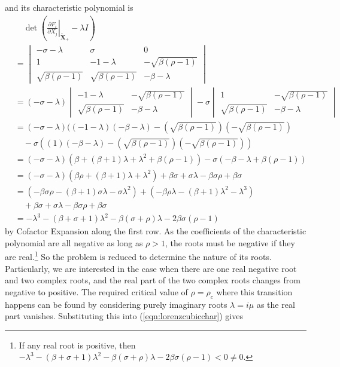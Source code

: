 and its characteristic polynomial is
\begin{align}
&\quad \det(\left.\frac{\partial F_i}{\partial X_j}\right|_{\tilde{\textbf{X}}_{+}} - \lambda I) \nonumber \\
&= 
\begin{vmatrix}
-\sigma-\lambda & \sigma & 0 \\
1 & -1-\lambda & -\sqrt{\beta (\rho - 1)} \\
\sqrt{\beta (\rho - 1)} & \sqrt{\beta (\rho - 1)} & -\beta-\lambda
\end{vmatrix} \nonumber \\ 
&= (-\sigma-\lambda)
\begin{vmatrix}
-1-\lambda & -\sqrt{\beta (\rho - 1)} \\  
\sqrt{\beta (\rho - 1)} & -\beta-\lambda 
\end{vmatrix} - \sigma
\begin{vmatrix}
1 & -\sqrt{\beta (\rho - 1)} \\
\sqrt{\beta (\rho - 1)} & -\beta-\lambda    
\end{vmatrix} \nonumber \\
&= (-\sigma - \lambda)((-1-\lambda)( -\beta-\lambda) - (\sqrt{\beta (\rho - 1)})(-\sqrt{\beta (\rho - 1)}) \nonumber \\
&\quad -\sigma((1)(-\beta-\lambda) - (\sqrt{\beta (\rho - 1)})(-\sqrt{\beta (\rho - 1)})) \nonumber \\
&= (-\sigma - \lambda)(\beta + (\beta+1)\lambda + \lambda^2 + \beta(\rho-1)) -\sigma(-\beta-\lambda + \beta (\rho - 1)) \nonumber\\
&= (-\sigma - \lambda)(\beta\rho + (\beta+1)\lambda + \lambda^2) + \beta\sigma + \sigma\lambda - \beta\sigma\rho + \beta\sigma \nonumber \\
&= (-\beta\sigma\rho -(\beta+1)\sigma\lambda - \sigma \lambda^2) + (-\beta\rho\lambda - (\beta+1)\lambda^2 - \lambda^3) \nonumber\\
&\quad + \beta\sigma + \sigma\lambda - \beta\sigma\rho + \beta\sigma \nonumber \\
&= -\lambda^3 - (\beta + \sigma + 1)\lambda^2 -\beta(\sigma + \rho)\lambda -2 \beta\sigma(\rho - 1) \label{eqn:lorenzcubicchar}
\end{align}
by Cofactor Expansion along the first row. As the coefficients of the characteristic polynomial are all negative as long as $\rho > 1$, the roots must be negative if they are real.\footnote{If any real root is positive, then $-\lambda^3 - (\beta + \sigma + 1)\lambda^2 -\beta(\sigma + \rho)\lambda - 2 \beta\sigma(\rho - 1) < 0 \neq 0$.} So the problem is reduced to determine the nature of its roots. Particularly, we are interested in the case when there are one real negative root and two complex roots, and the real part of the two complex roots changes from negative to positive. The required critical value of $\rho = \rho_c$ where this transition happens can be found by considering purely imaginary roots $\lambda = i\mu$ as the real part vanishes. Substituting this into (\ref{eqn:lorenzcubicchar}) gives
